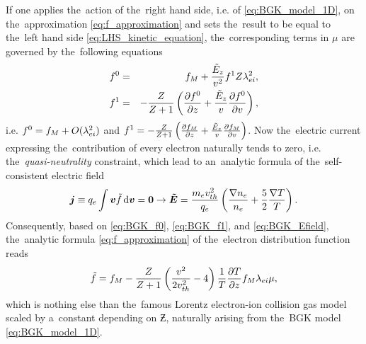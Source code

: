 If one applies the~action of the~right hand side, i.e. of 
\eqref{eq:BGK_model_1D}, 
on the~approximation \eqref{eq:f_approximation} and sets the~result to be equal 
to the~left hand side \eqref{eq:LHS_kinetic_equation}, the~corresponding terms
in $\mu$ are governed by the~following equations
\begin{eqnarray}
  f^0 &=& f_M + \frac{\tilde{E}_z}{v^2}f^1 Z\lambda_{ei}^2 ,
  \label{app_eq:BGK_f0} \\
  f^1 &=& - \frac{Z}{Z+1}
  \left( \frac{\partial{f^0}}{\partial{z}} + \frac{\tilde{E}_z}{v}\frac{\partial{f^0}}{\partial{v}} \right) , 
  \label{app_eq:BGK_f1}
\end{eqnarray}
i.e. $f^0 = f_M + O(\lambda_{ei}^2)$ and $f^1 = - \frac{Z}{Z+1}
  \left( \frac{\partial{f_M}}{\partial{z}} + \frac{\tilde{E}_z}{v}\frac{\partial{f_M}}{\partial{v}} \right)$.
Now the~electric current expressing the~contribution of every electron 
naturally tends to zero, i.e. the~\textit{quasi-neutrality} constraint, 
which lead to an~analytic formula of the~self-consistent electric field
\begin{multline}
\boldsymbol{j} \equiv q_e \int \boldsymbol{v} \tilde{f} \, \text{d}\boldsymbol{v} = \boldsymbol{0}  \rightarrow
\boldsymbol{\tilde{E}} = \frac{m_ev_{th}^2}{q_e}\left(\frac{\nabla n_e}{n_e} + \frac{5}{2}\frac{\nabla T}{T} 
\right) .
\label{app_eq:BGK_Efield}
\end{multline}
Consequently, based on \eqref{eq:BGK_f0}, \eqref{eq:BGK_f1}, 
and \eqref{eq:BGK_Efield}, the~analytic formula \eqref{eq:f_approximation}
of the~electron distribution function reads 
\begin{equation}
  \tilde{f} = f_M - \frac{Z}{Z+1}
  \left( \frac{v^2}{2 v_{th}^2} - 4\right)
  \frac{1}{T}\frac{\partial{T}}{\partial{z}}f_M \lambda_{ei} \mu , 
  \label{app_eq:BGK_approximation}
\end{equation}
which is nothing else than the~famous Lorentz electron-ion collision gas model 
\cite{Lorentz_1905} scaled by a~constant depending on $\Zbar$, 
naturally arising from the~BGK model \eqref{eq:BGK_model_1D}.

